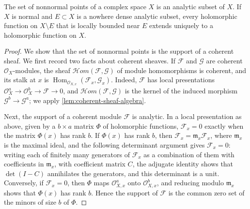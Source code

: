 \begin{lemma}\label{lem:normal-locus-open}
The set of nonnormal points of a complex space $X$ is an analytic subset of $X$. If $X$ is normal and $E\subset X$ is a nowhere dense analytic subset, every holomorphic function on $X\setminus E$ that is locally bounded near $E$ extends uniquely to a holomorphic function on $X$.
\end{lemma}
\begin{proof}
We show that the set of nonnormal points is the support of a coherent sheaf. We first record two facts about coherent sheaves. If $\mathcal F$ and $\mathcal G$ are coherent $\mathcal O_X$-modules, the sheaf $\mathcal Hom(\mathcal F,\mathcal G)$ of module homomorphisms is coherent, and its stalk at $x$ is $\operatorname{Hom}_{\mathcal O_{X,x}}(\mathcal F_x,\mathcal G_x)$. Indeed, $\mathcal F$ has local presentations $\mathcal O_X^a\to\mathcal O_X^b\to\mathcal F\to0$, and $\mathcal Hom(\mathcal F,\mathcal G)$ is the kernel of the induced morphism $\mathcal G^b\to\mathcal G^a$; we apply \cref{lem:coherent-sheaf-algebra}.

Next, the support of a coherent module $\mathcal F$ is analytic. In a local presentation as above, given by a $b\times a$ matrix $\Phi$ of holomorphic functions, $\mathcal F_x=0$ exactly when the matrix $\Phi(x)$ has rank $b$. If $\Phi(x)$ has rank $b$, then $\mathcal F_x=\mathfrak m_x\mathcal F_x$, where $\mathfrak m_x$ is the maximal ideal, and the following determinant argument gives $\mathcal F_x=0$: writing each of finitely many generators of $\mathcal F_x$ as a combination of them with coefficients in $\mathfrak m_x$, with coefficient matrix $C$, the adjugate identity shows that $\det(I-C)$ annihilates the generators, and this determinant is a unit. Conversely, if $\mathcal F_x=0$, then $\Phi$ maps $\mathcal O_{X,x}^a$ onto $\mathcal O_{X,x}^b$, and reducing modulo $\mathfrak m_x$ shows that $\Phi(x)$ has rank $b$. Hence the support of $\mathcal F$ is the common zero set of the minors of size $b$ of $\Phi$.


\end{proof}
